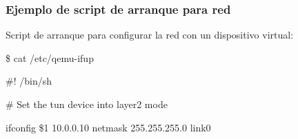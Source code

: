 \documentclass{beamer}
\begin{document}
\begin{frame}
\frametitle{Ejemplo de script de arranque para red}

Script de arranque para configurar la red con un dispositivo virtual:
\begin{semiverbatim}
\$ cat /etc/qemu-ifup

\#! /bin/sh

\medskip

\# Set the tun device into layer2 mode

ifconfig \$1 10.0.0.10 netmask 255.255.255.0 link0 

\end{semiverbatim}
\end{frame}

\end{document}
